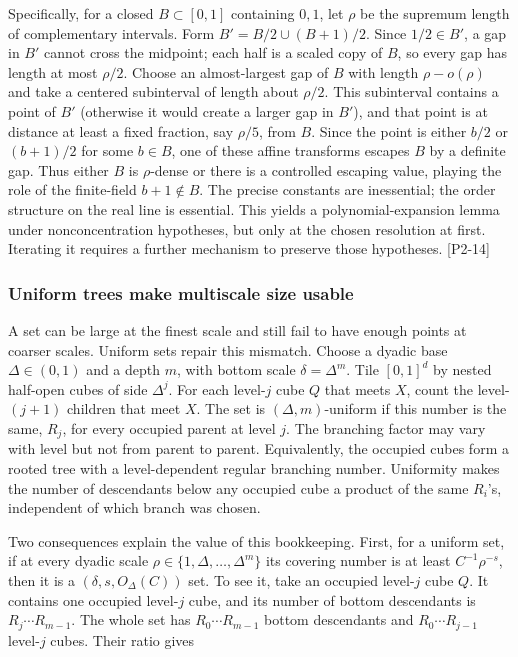Specifically, for a closed \(B\subset[0,1]\) containing \(0,1\), let \(\rho\) be the supremum length of complementary intervals. Form \(B'=B/2\cup(B+1)/2\). Since \(1/2\in B'\), a gap in \(B'\) cannot cross the midpoint; each half is a scaled copy of \(B\), so every gap has length at most \(\rho/2\). Choose an almost-largest gap of \(B\) with length \(\rho-o(\rho)\) and take a centered subinterval of length about \(\rho/2\). This subinterval contains a point of \(B'\) (otherwise it would create a larger gap in \(B'\)), and that point is at distance at least a fixed fraction, say \(\rho/5\), from \(B\). Since the point is either \(b/2\) or \((b+1)/2\) for some \(b\in B\), one of these affine transforms escapes \(B\) by a definite gap. Thus either \(B\) is \(\rho\)-dense or there is a controlled escaping value, playing the role of the finite-field \(b+1\notin B\). The precise constants are inessential; the order structure on the real line is essential. This yields a polynomial-expansion lemma under nonconcentration hypotheses, but only at the chosen resolution at first. Iterating it requires a further mechanism to preserve those hypotheses. {[}P2-14{]}

\subsubsection{Uniform trees make multiscale size usable}\label{04-visual-computing-ii-ch033-uniform-trees-make-multiscale-size-usable-1}

\hypertarget{04-visual-computing-ii-ch033-uniform-trees-make-multiscale-size-usable-1}{}

A set can be large at the finest scale and still fail to have enough points at coarser scales. Uniform sets repair this mismatch. Choose a dyadic base \(\Delta\in(0,1)\) and a depth \(m\), with bottom scale \(\delta=\Delta^m\). Tile \([0,1]^d\) by nested half-open cubes of side \(\Delta^j\). For each level-\(j\) cube \(Q\) that meets \(X\), count the level-\((j+1)\) children that meet \(X\). The set is \((\Delta,m)\)-uniform if this number is the same, \(R_j\), for every occupied parent at level \(j\). The branching factor may vary with level but not from parent to parent. Equivalently, the occupied cubes form a rooted tree with a level-dependent regular branching number. Uniformity makes the number of descendants below any occupied cube a product of the same \(R_i\)'s, independent of which branch was chosen.

Two consequences explain the value of this bookkeeping. First, for a uniform set, if at every dyadic scale \(\rho\in\{1,\Delta,\ldots,\Delta^m\}\) its covering number is at least \(C^{-1}\rho^{-s}\), then it is a \((\delta,s,O_\Delta(C))\) set. To see it, take an occupied level-\(j\) cube \(Q\). It contains one occupied level-\(j\) cube, and its number of bottom descendants is \(R_j\cdots R_{m-1}\). The whole set has \(R_0\cdots R_{m-1}\) bottom descendants and \(R_0\cdots R_{j-1}\) level-\(j\) cubes. Their ratio gives


